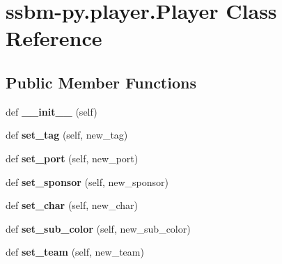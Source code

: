 \hypertarget{classssbm-py_1_1player_1_1_player}{}\section{ssbm-\/py.player.\+Player Class Reference}
\label{classssbm-py_1_1player_1_1_player}
\subsection*{Public Member Functions}
\begin{DoxyCompactItemize}
\item 
\mbox{\label{classssbm-py_1_1player_1_1_player_aeb22f9b0e07e0dd274950ff502183570}} 
def {\bfseries \+\_\+\+\_\+init\+\_\+\+\_\+} (self)
\item 
\mbox{\label{classssbm-py_1_1player_1_1_player_ab108135e28b39fd47eb28b698d8e7dca}} 
def {\bfseries set\+\_\+tag} (self, new\+\_\+tag)
\item 
\mbox{\label{classssbm-py_1_1player_1_1_player_a25b5683581a1137b24933f56ceb5a1e5}} 
def {\bfseries set\+\_\+port} (self, new\+\_\+port)
\item 
\mbox{\label{classssbm-py_1_1player_1_1_player_a02aabdf9e64edec1329c4be1a2f7508c}} 
def {\bfseries set\+\_\+sponsor} (self, new\+\_\+sponsor)
\item 
\mbox{\label{classssbm-py_1_1player_1_1_player_ae43cdb84af3cf17196da1d9f6cda1bbd}} 
def {\bfseries set\+\_\+char} (self, new\+\_\+char)
\item 
\mbox{\label{classssbm-py_1_1player_1_1_player_a6489819d117a20bc66da65479679e931}} 
def {\bfseries set\+\_\+sub\+\_\+color} (self, new\+\_\+sub\+\_\+color)
\item 
\mbox{\label{classssbm-py_1_1player_1_1_player_a76ee5811187bdd2bf707aefa7fe8289f}} 
def {\bfseries set\+\_\+team} (self, new\+\_\+team)
\item 
\mbox{\label{classssbm-py_1_1player_1_1_player_a249df262cf377aa1a4ad4c1a28ed4c3c}} 

\end{DoxyCompactItemize}
